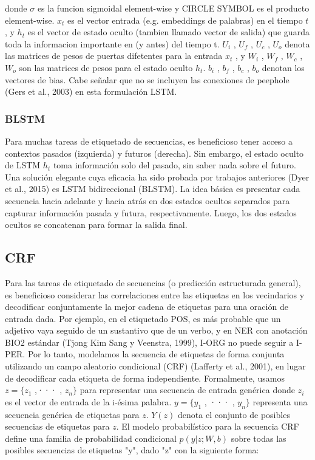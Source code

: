 \documentclass[runningheads]{llncs}
\begin{document}

donde $\sigma$ es la funcion sigmoidal element-wise y CIRCLE SYMBOL es el producto element-wise. $x_{t}$ es el  vector entrada (e.g. embeddings de palabras) en el tiempo $t$, y $h_{t}$ es el vector de estado oculto (tambien llamado vector de salida) que guarda toda la informacion importante en (y antes) del tiempo  t. $U_{i}$ , $U_{f}$ , $U_{c}$ , $U_{o}$ denota las matrices de pesos de puertas difetentes para la entrada $x_{t}$ , y $W_{i}$ , $W_{f}$ , $ W_{c}$ , $W_{o}$ son las matrices de pesos para el estado oculto $h_{t}$. $b_{i}$ , $b_{f}$ , $b_{c}$ , $b_{o}$ denotan los vectores de bias. Cabe señalar que no se incluyen las conexiones de peephole (Gers et al., 2003) en esta formulación LSTM.

\subsubsection{BLSTM}
Para muchas tareas de etiquetado de secuencias, es beneficioso tener acceso a contextos pasados (izquierda) y futuros (derecha). Sin embargo, el estado oculto de LSTM $h_{t}$ toma información solo del pasado, sin saber nada sobre el futuro. Una solución elegante cuya eficacia ha sido probada por trabajos anteriores (Dyer et al., 2015) es LSTM bidireccional (BLSTM). La idea básica es presentar cada secuencia hacia adelante y hacia atrás en dos estados ocultos separados para capturar información pasada y futura, respectivamente. Luego, los dos estados ocultos se concatenan para formar la salida final.

\subsection{CRF}
Para las tareas de etiquetado de secuencias (o predicción estructurada general), es beneficioso considerar las correlaciones entre las etiquetas en los vecindarios y decodificar conjuntamente la mejor cadena de etiquetas para una oración de entrada dada. Por ejemplo, en el etiquetado POS, es más probable que un adjetivo vaya seguido de un sustantivo que de un verbo, y en NER con anotación BIO2 estándar (Tjong Kim Sang y Veenstra, 1999), I-ORG no puede seguir a I-PER. Por lo tanto, modelamos la secuencia de etiquetas de forma conjunta utilizando un campo aleatorio condicional (CRF) (Lafferty et al., 2001), en lugar de decodificar cada etiqueta de forma independiente. Formalmente, usamos $z = \{z_{1}$ ,··· , $z_{n} \}$ para representar una secuencia de entrada genérica donde $z_{i}$ es el vector de entrada de la i-ésima palabra. $y = \{y_{1}$ , ··· , $y_n \}$ representa una secuencia genérica de etiquetas para $z$. $Y(z)$ denota el conjunto de posibles secuencias de etiquetas para $z$. El modelo probabilístico para la secuencia CRF define una familia de probabilidad condicional $p(y|z; W, b)$ sobre todas las posibles secuencias de etiquetas "y", dado "z" con la siguiente forma:
\end{document}
